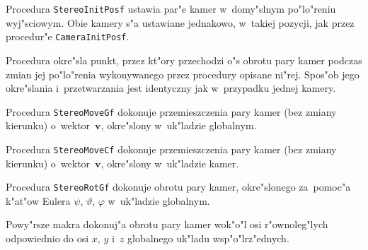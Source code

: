 \vspace{\bigskipamount}
Procedura \texttt{StereoInitPosf} ustawia par"e kamer w~domy"slnym
po"lo"reniu wyj"s\-cio\-wym. Obie kamery s"a ustawiane jednakowo, w~takiej
pozycji, jak przez procedur"e \texttt{CameraInitPosf}.

\newpage
Procedura okre"sla punkt, przez kt"ory przechodzi o"s obrotu pary kamer
podczas zmian jej po"lo"renia wykonywanego przez procedury opisane ni"rej.
Spos"ob jego okre"slania i~przetwarzania jest identyczny jak w~przypadku
jednej kamery.

\vspace{\bigskipamount}
Procedura \texttt{StereoMoveGf} dokonuje przemieszczenia pary kamer (bez
zmiany kierunku) o~wektor~$\bm{v}$, okre"slony w~uk"ladzie globalnym.

\vspace{\bigskipamount}
Procedura \texttt{StereoMoveCf} dokonuje przemieszczenia pary kamer (bez
zmiany kierunku) o~wektor~$\bm{v}$, okre"slony w~uk"ladzie kamer.

\vspace{\bigskipamount}
Procedura \texttt{StereoRotGf} dokonuje obrotu pary kamer, okre"slonego
za~pomoc"a k"at"ow Eulera $\psi$, $\vartheta$, $\varphi$ w~uk"ladzie globalnym.

\vspace{\bigskipamount}
Powy"rsze makra dokonuj"a obrotu pary kamer wok"o"l osi r"ownoleg"lych
odpowiednio do osi $x$, $y$ i~$z$ globalnego uk"ladu wsp"o"lrz"ednych.

